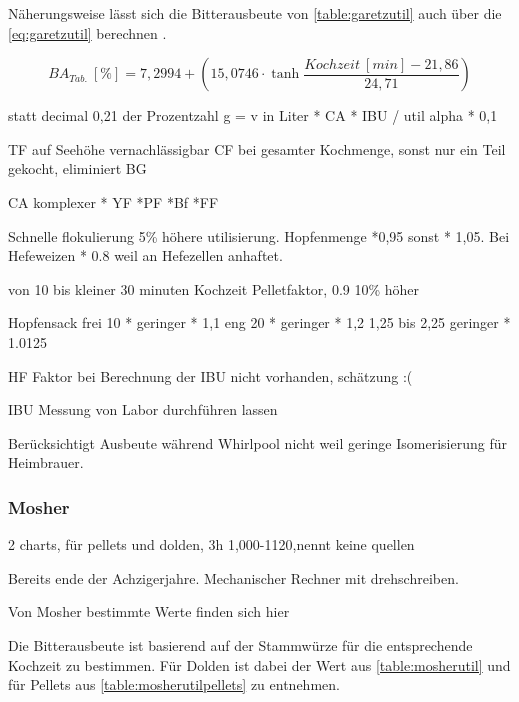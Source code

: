 \documentclass[a4paper,parskip=half]{scrartcl}
\begin{document}
Näherungsweise lässt sich die Bitterausbeute von \autoref{table:garetzutil}
auch über die \autoref{eq:garetzutil} berechnen \parencite{Steinmeyer2021}. 

\begin{equation}
\mathit{BA}_{\mathit{Tab.}}\:[\%] = 7,2994 + \left(15,0746 \cdot \tanh{\frac{\mathit{Kochzeit}\:[min] - 21,86}{24,71}}\right)
\label{eq:garetzutil}
\end{equation}


statt decimal 0,21 der Prozentzahl 
g = v in Liter * CA * IBU / util  alpha * 0,1

TF auf Seehöhe vernachlässigbar
CF bei gesamter Kochmenge, sonst nur ein Teil gekocht, eliminiert BG

CA komplexer * YF *PF *Bf *FF

\parencite[140\psq]{Garetz1994} 
Schnelle flokulierung 5\% höhere utilisierung. Hopfenmenge *0,95
sonst * 1,05. Bei Hefeweizen * 0.8 weil an Hefezellen anhaftet.

von 10 bis kleiner 30 minuten Kochzeit Pelletfaktor, 0.9 10\% höher

Hopfensack
frei 10 * geringer * 1,1
eng 20 * geringer * 1,2
1,25 bis 2,25 geringer * 1.0125

HF Faktor bei Berechnung der IBU nicht vorhanden, schätzung :(

\parencite[134-144]{Garetz1994} 

IBU Messung von Labor durchführen lassen
\parencite[145]{Garetz1994} 

Berücksichtigt Ausbeute während Whirlpool nicht weil geringe
Isomerisierung für Heimbrauer.
\parencite[167]{Garetz1994} 

\subsubsection*{Mosher}

2 charts, für pellets und dolden, 3h 1,000-1120,nennt keine quellen
\parencite[160\psq]{Mosher1994}

\parencite{Mosher2022} Bereits ende der Achzigerjahre. Mechanischer
Rechner mit drehschreiben.

\parencite[51]{Holle2010}
Von Mosher bestimmte Werte finden sich hier

\parencite[9]{Thesseling2019}

Die Bitterausbeute ist basierend auf der Stammwürze für die entsprechende
Kochzeit zu bestimmen. Für Dolden ist dabei der Wert aus \autoref{table:mosherutil}
und für Pellets aus \autoref{table:mosherutilpellets} zu entnehmen.
\end{document}
